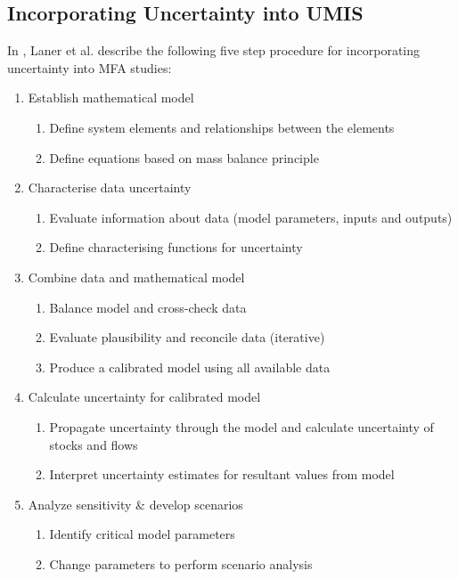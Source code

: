 \documentclass[ %
                    author={Tom Jager},
                supervisor={Dr. Daniel Schien},
                    degree={MEng},
                     title={A Bayesian Inference Engine for Calibrating Uncertainty over UMIS Structured MFA Systems},
                  subtitle={},
                      type={research},
                      year={2019} ]{dissertation}
\begin{document}
\subsection{Incorporating Uncertainty into UMIS}
\label{sec:incorporating_uncertainty}
In \cite{laner2014systematic}, Laner et al. describe the following five step procedure for incorporating uncertainty into MFA studies:

{
\begin{enumerate}
    \item Establish mathematical model
    \begin{enumerate}
        \item Define system elements and relationships between the elements
        \item Define equations based on mass balance principle
    \end{enumerate}
    
    \item Characterise data uncertainty
    \begin{enumerate}
        \item Evaluate information about data (model parameters, inputs and outputs)
        \item Define characterising functions for uncertainty
    \end{enumerate}
    
    \item Combine data and mathematical model
    \begin{enumerate}
        \item Balance model and cross-check data
        \item Evaluate plausibility and reconcile data (iterative)
        \item Produce a calibrated model using all available data
    \end{enumerate}
    
    \item Calculate uncertainty for calibrated model
    \begin{enumerate}
        \item Propagate uncertainty through the model and calculate uncertainty of stocks and flows
        \item Interpret uncertainty estimates for resultant values from model 
    \end{enumerate}
    
    \item Analyze sensitivity \& develop scenarios
    \begin{enumerate}
        \item Identify critical model parameters
        \item Change parameters to perform scenario analysis
    \end{enumerate}
\end{enumerate}
}
\end{document}
